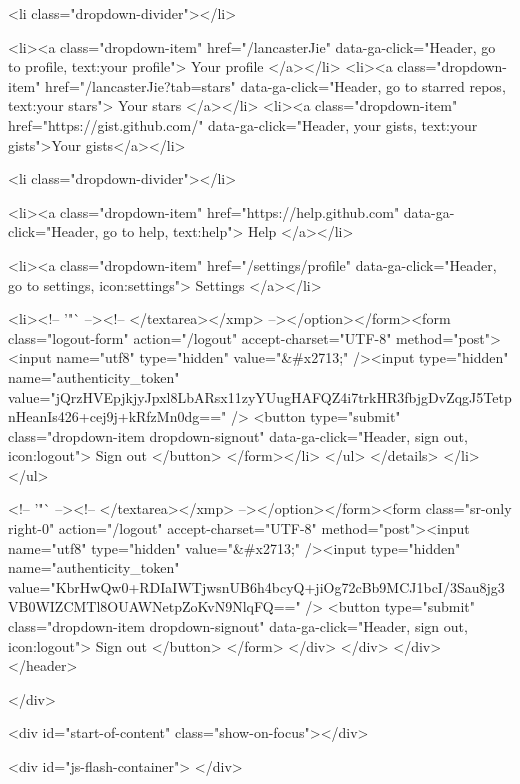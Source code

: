         <li class="dropdown-divider"></li>

        <li><a class="dropdown-item" href="/lancasterJie" data-ga-click="Header, go to profile, text:your profile">
          Your profile
        </a></li>
        <li><a class="dropdown-item" href="/lancasterJie?tab=stars" data-ga-click="Header, go to starred repos, text:your stars">
          Your stars
        </a></li>
          <li><a class="dropdown-item" href="https://gist.github.com/" data-ga-click="Header, your gists, text:your gists">Your gists</a></li>

        <li class="dropdown-divider"></li>

        <li><a class="dropdown-item" href="https://help.github.com" data-ga-click="Header, go to help, text:help">
          Help
        </a></li>

        <li><a class="dropdown-item" href="/settings/profile" data-ga-click="Header, go to settings, icon:settings">
          Settings
        </a></li>

        <li><!-- '"` --><!-- </textarea></xmp> --></option></form><form class="logout-form" action="/logout" accept-charset="UTF-8" method="post"><input name="utf8" type="hidden" value="&#x2713;" /><input type="hidden" name="authenticity_token" value="jQrzHVEpjkjyJpxl8LbARsx11zyYUugHAFQZ4i7trkHR3fbjgDvZqgJ5TetpnHeanIs426+cej9j+kRfzMn0dg==" />
          <button type="submit" class="dropdown-item dropdown-signout" data-ga-click="Header, sign out, icon:logout">
            Sign out
          </button>
        </form></li>
      </ul>
    </details>
  </li>
</ul>



        <!-- '"` --><!-- </textarea></xmp> --></option></form><form class="sr-only right-0" action="/logout" accept-charset="UTF-8" method="post"><input name="utf8" type="hidden" value="&#x2713;" /><input type="hidden" name="authenticity_token" value="KbrHwQw0+RDIaIWTjwsnUB6h4bcyQ+jiOg72cBb9MCJ1bcI/3Sau8jg3VB0WIZCMTl8OUAWNetpZoKvN9NlqFQ==" />
          <button type="submit" class="dropdown-item dropdown-signout" data-ga-click="Header, sign out, icon:logout">
            Sign out
          </button>
</form>      </div>
    </div>
  </div>
</header>

      

  </div>

  <div id="start-of-content" class="show-on-focus"></div>

    <div id="js-flash-container">
</div>



